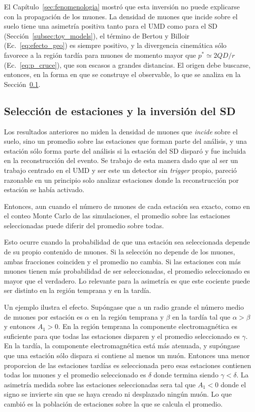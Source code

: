 El Capítulo~\ref{sec:fenomenologia} mostró que esta inversión no puede explicarse con la propagación de los muones. La densidad de muones que incide sobre el suelo tiene una asimetría positiva tanto para el UMD como para el SD (Sección~\ref{subsec:toy_models}), el término de Bertou y Billoir (Ec.~\ref{eq:efecto_geo}) es siempre positivo, y la divergencia cinemática sólo favorece a la región tardía para muones de momento mayor que $p^* \simeq 2QD/r$ (Ec.~\ref{eq:p_cruce}), que son escasos a grandes distancias. El origen debe buscarse, entonces, en la forma en que se construye el observable, lo que se analiza en la Sección~\ref{subsec:seleccion_estaciones}.

\subsection{Selección de estaciones y la inversión del SD}
\label{subsec:seleccion_estaciones}

Los resultados anteriores no miden la densidad de muones que \textit{incide} sobre el suelo, sino un promedio sobre las estaciones que forman parte del análisis, y una estación sólo forma parte del análisis si la estación del SD disparó y fue incluida en la reconstrucción del evento. Se trabajo de esta manera dado que al ser un trabajo centrado en el UMD y ser este un detector sin \textit{trigger} propio, pareció razonable en un principio solo analizar estaciones donde la reconstrucción por estación se había activado. 

Entonces, aun cuando el número de muones de cada estación sea exacto, como en el conteo Monte Carlo de las simulaciones, el promedio sobre las estaciones seleccionadas puede diferir del promedio sobre todas.

Esto ocurre cuando la probabilidad de que una estación sea seleccionada depende de su propio contenido de muones. Si la selección no depende de los muones, ambas fracciones coinciden y el promedio no cambia. Si las estaciones con más muones tienen más probabilidad de ser seleccionadas, el promedio seleccionado es mayor que el verdadero. Lo relevante para la asimetría es que este cociente puede ser distinto en la región temprana y en la tardía.

Un ejemplo ilustra el efecto. Supóngase que a un radio grande el número medio de muones por estación es $\alpha$ en la región temprana y $\beta$ en la tardía tal que $\alpha > \beta$ y entonces $A_1>0$. En la región temprana la componente electromagnética es suficiente para que todas las estaciones disparen y el promedio seleccionado es $\gamma$. En la tardía, la componente electromagnética está más atenuada, y supóngase que una estación sólo dispara si contiene al menos un muón. Entonces una menor proporcion de las estaciones tardías es seleccionada pero esas estaciones contienen todas los muones y el promedio seleccionado es $\delta$ donde termina siendo $\gamma < \delta$. La asimetría medida sobre las estaciones seleccionadas sera tal que $A_1 < 0$ donde el signo se invierte sin que se haya creado ni desplazado ningún muón. Lo que cambió es la población de estaciones sobre la que se calcula el promedio.

